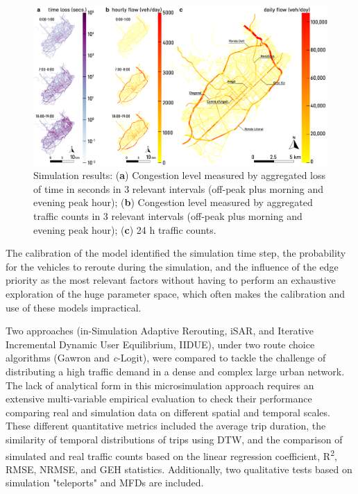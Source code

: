 \begin{figure}[htbp!]
    \centering
    \includegraphics[width=1\textwidth]{fig_12.png}
    \caption{Simulation results: (\textbf{a}) Congestion level measured by aggregated loss of time in seconds in 3 relevant intervals (off-peak plus morning and evening peak hour); (\textbf{b}) Congestion level measured by aggregated traffic counts in 3 relevant intervals (off-peak plus morning and evening peak hour); (\textbf{c}) 24 h traffic counts.}
   \label{fig:getting_real_12_result_summary}
\end{figure}

The calibration of the model identified the simulation time step, the probability for the vehicles to reroute during the simulation, and the influence of the edge priority as the most relevant factors without having to perform an exhaustive exploration of the huge parameter space, which often makes the calibration and use of these models impractical.

Two approaches (in-Simulation Adaptive Rerouting, iSAR, and Iterative Incremental Dynamic User Equilibrium, IIDUE), under two route choice algorithms (Gawron and \emph{c}-Logit), were compared to tackle the challenge of distributing a high traffic demand in a dense and complex large urban network. The lack of analytical form in this microsimulation approach requires an extensive multi-variable empirical evaluation to check their performance comparing real and simulation data on different spatial and temporal scales. These different quantitative metrics included the average trip duration, the similarity of temporal distributions of trips using DTW, and the comparison of simulated and real traffic counts based on the linear regression coefficient, R\textsuperscript{2}, RMSE, NRMSE, and GEH statistics. Additionally, two qualitative tests based on simulation "teleports" and MFDs are included.


